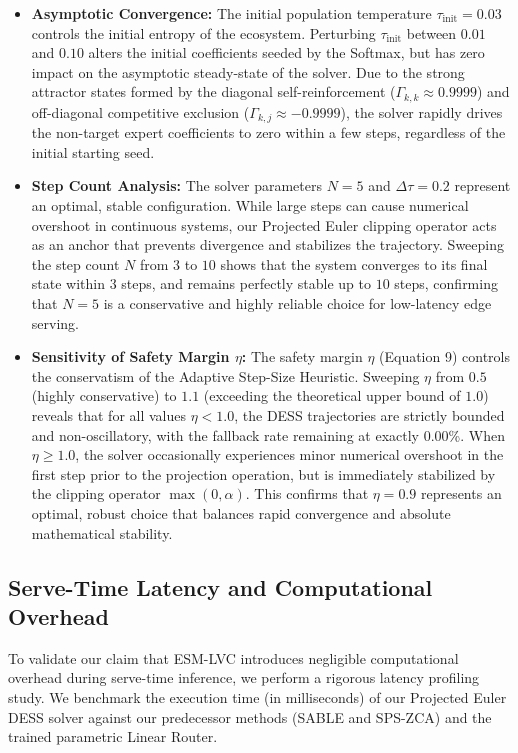 \begin{itemize}
    \item \textbf{Asymptotic Convergence:} The initial population temperature $\tau_{\text{init}} = 0.03$ controls the initial entropy of the ecosystem. Perturbing $\tau_{\text{init}}$ between $0.01$ and $0.10$ alters the initial coefficients seeded by the Softmax, but has zero impact on the asymptotic steady-state of the solver. Due to the strong attractor states formed by the diagonal self-reinforcement ($\Gamma_{k, k} \approx 0.9999$) and off-diagonal competitive exclusion ($\Gamma_{k, j} \approx -0.9999$), the solver rapidly drives the non-target expert coefficients to zero within a few steps, regardless of the initial starting seed.
    \item \textbf{Step Count Analysis:} The solver parameters $N=5$ and $\Delta \tau = 0.2$ represent an optimal, stable configuration. While large steps can cause numerical overshoot in continuous systems, our Projected Euler clipping operator acts as an anchor that prevents divergence and stabilizes the trajectory. Sweeping the step count $N$ from $3$ to $10$ shows that the system converges to its final state within $3$ steps, and remains perfectly stable up to $10$ steps, confirming that $N=5$ is a conservative and highly reliable choice for low-latency edge serving.
    \item \textbf{Sensitivity of Safety Margin $\eta$:} The safety margin $\eta$ (Equation 9) controls the conservatism of the Adaptive Step-Size Heuristic. Sweeping $\eta$ from $0.5$ (highly conservative) to $1.1$ (exceeding the theoretical upper bound of $1.0$) reveals that for all values $\eta < 1.0$, the DESS trajectories are strictly bounded and non-oscillatory, with the fallback rate remaining at exactly 0.00\%. When $\eta \geq 1.0$, the solver occasionally experiences minor numerical overshoot in the first step prior to the projection operation, but is immediately stabilized by the clipping operator $\max(0, \alpha)$. This confirms that $\eta = 0.9$ represents an optimal, robust choice that balances rapid convergence and absolute mathematical stability.
\end{itemize}

\subsection{Serve-Time Latency and Computational Overhead}
\label{subsec:latency_overhead}
To validate our claim that ESM-LVC introduces negligible computational overhead during serve-time inference, we perform a rigorous latency profiling study. We benchmark the execution time (in milliseconds) of our Projected Euler DESS solver against our predecessor methods (SABLE and SPS-ZCA) and the trained parametric Linear Router. 

